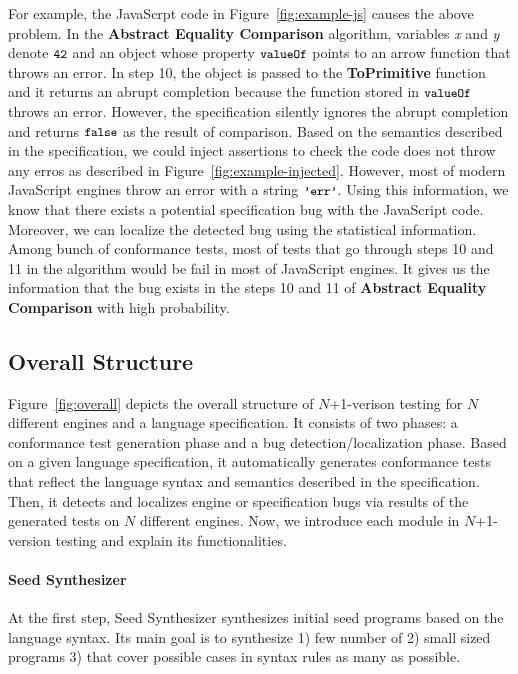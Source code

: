 For example, the JavaScrpt code in Figure~\ref{fig:example-js} causes the above
problem.  In the \textbf{Abstract Equality Comparison} algorithm, variables
\textit{x} and \textit{y} denote $\code{42}$ and an object whose property
$\code{valueOf}$ points to an arrow function that throws an error.  In step 10,
the object is passed to the \textbf{ToPrimitive} function and it returns an
abrupt completion because the function stored in $\code{valueOf}$ throws an
error.  However, the specification silently ignores the abrupt completion and
returns $\code{false}$ as the result of comparison.  Based on the semantics
described in the specification, we could inject assertions to check the code
does not throw any erros as described in Figure~\ref{fig:example-injected}.
However, most of modern JavaScript engines throw an error with a string
$\code{'err'}$.  Using this information, we know that there exists a potential
specification bug with the JavaScript code.  Moreover, we can localize the
detected bug using the statistical information. Among bunch of conformance
tests, most of tests that go through steps 10 and 11 in the algorithm would be
fail in most of JavaScript engines.  It gives us the information that the bug
exists in the steps 10 and 11 of \textbf{Abstract Equality Comparison} with high
probability.


\subsection{Overall Structure}

Figure~\ref{fig:overall} depicts the overall structure of $N$+1-verison testing
for $N$ different engines and a language specification.  It consists of two
phases: a conformance test generation phase and a bug detection/localization
phase.  Based on a given language specification, it automatically generates
conformance tests that reflect the language syntax and semantics described in
the specification.  Then, it detects and localizes engine or specification bugs
via results of the generated tests on $N$ different engines.  Now, we introduce
each module in $N$+1-version testing and explain its functionalities.

\paragraph{Seed Synthesizer}
At the first step, \textsf{Seed Synthesizer} synthesizes initial seed programs
based on the language syntax.  Its main goal is to synthesize 1) few number of
2) small sized programs 3) that cover possible cases in syntax rules as many as
possible.

